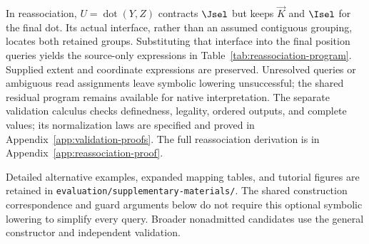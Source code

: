 In reassociation, $U=\operatorname{dot}(Y,Z)$ contracts $\Jsel$ but keeps
$\vec K$ and $\Isel$ for the final dot. Its actual interface, rather than
an assumed contiguous grouping, locates both retained groups.
Substituting that interface into the final position queries yields the
source-only expressions in Table~\ref{tab:reassociation-program}.
Supplied extent and coordinate expressions are preserved. Unresolved
queries or ambiguous read assignments leave symbolic lowering unsuccessful;
the shared residual program remains available for native interpretation.
The separate validation calculus checks definedness, legality, ordered
outputs, and complete values; its normalization laws are specified and
proved in Appendix~\ref{app:validation-proofs}. The full reassociation
derivation is in Appendix~\ref{app:reassociation-proof}.

Detailed alternative examples, expanded mapping tables, and tutorial
figures are retained in \nolinkurl{evaluation/supplementary-materials/}.
The shared construction correspondence and guard arguments below do not
require this optional symbolic lowering to simplify every query. Broader
nonadmitted candidates use the general constructor and independent validation.

